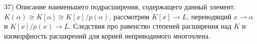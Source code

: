 37) Описание наименьшего подрасширения, содержащего данный элемент.\\
$K(\alpha) \cong K[\alpha] \cong K[x]/p(\alpha)$, рассмотрим $K[x] \to L$, переводящий $x \to \alpha$ и $K[x]/p(x) \to L$.
Следствия про равенство степеней расширения над $K$ и изоморфность расширений для корней неприводимого многочлена.\\
